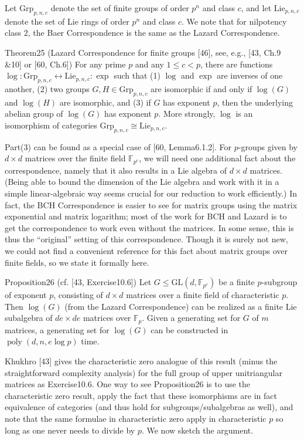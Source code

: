 Let $\mathrm{Grp}_{p,n,c}$ denote the set of finite groups of order $p^n$ and class $c$, and let $\mathrm{Lie}_{p,n,c}$ denote the set of Lie rings of order $p^n$ and class $c$. We note that for nilpotency class 2, the Baer Correspondence is the same as the Lazard Correspondence.
\begin{authorclaim}{Theorem25 (Lazard Correspondence for finite groups [46], see, e.g., [43, Ch.9 \&10] or [60, Ch.6])}
For any prime $p$ and any $1\le c<p$, there are functions $\log:\mathrm{Grp}_{p,n,c}\leftrightarrow\mathrm{Lie}_{p,n,c}:\exp$ such that (1) $\log$ and $\exp$ are inverses of one another, (2) two groups $G,H\in\mathrm{Grp}_{p,n,c}$ are isomorphic if and only if $\log(G)$ and $\log(H)$ are isomorphic, and (3) if $G$ has exponent $p$, then the underlying abelian group of $\log(G)$ has exponent $p$. More strongly, $\log$ is an isomorphism of categories $\mathrm{Grp}_{p,n,c}\cong\mathrm{Lie}_{p,n,c}$.
\end{authorclaim}
Part(3) can be found as a special case of [60, Lemma6.1.2].
For $p$-groups given by $d\times d$ matrices over the finite field $\mathbb F_{p^e}$, we will need one additional fact about the correspondence, namely that it also results in a Lie algebra of $d\times d$ matrices. (Being able to bound the dimension of the Lie algebra and work with it in a simple linear-algebraic way seems crucial for our reduction to work efficiently.) In fact, the BCH Correspondence is easier to see for matrix groups using the matrix exponential and matrix logarithm; most of the work for BCH and Lazard is to get the correspondence to work even without the matrices. In some sense, this is thus the ``original'' setting of this correspondence. Though it is surely not new, we could not find a convenient reference for this fact about matrix groups over finite fields, so we state it formally here.
\begin{authorclaim}{Proposition26 (cf. [43, Exercise10.6])}
Let $G\le\mathrm{GL}(d,\mathbb F_{p^e})$ be a finite $p$-subgroup of exponent $p$, consisting of $d\times d$ matrices over a finite field of characteristic $p$. Then $\log(G)$ (from the Lazard Correspondence) can be realized as a finite Lie subalgebra of $de\times de$ matrices over $\mathbb F_p$. Given a generating set for $G$ of $m$ matrices, a generating set for $\log(G)$ can be constructed in $\operatorname{poly}(d,n,e\log p)$ time.
\end{authorclaim}
Khukhro [43] gives the characteristic zero analogue of this result (minus the straightforward complexity analysis) for the full group of upper unitriangular matrices as Exercise10.6. One way to see Proposition26 is to use the characteristic zero result, apply the fact that these isomorphisms are in fact equivalence of categories (and thus hold for subgroups/subalgebras as well), and note that the same formulae in characteristic zero apply in characteristic $p$ so long as one never needs to divide by $p$. We now sketch the argument.
